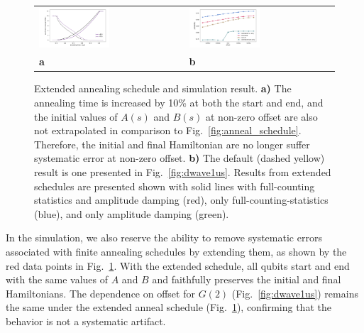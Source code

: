 \documentclass[prd,twocolumn,tightenlines,preprintnumbers,showpacs,superscriptaddress,notitlepage,nofootinbib,eqsecnum,floatfix,longbibliography,aps,10pt]{revtex4-1}
\begin{document}
\begin{figure}
    \centering
	\begin{tabular}{p{}p{}}
	\includegraphics[width=0.5\textwidth]{./anneal_schedule_extended.pdf}
    &
	\includegraphics[width=0.5\textwidth]{./NN2_offset_scaling_extended.pdf}\\
	\centering \textbf{a} & \centering \textbf{b}
	\end{tabular}
	\centering
	\caption{Extended annealing schedule and simulation result. \textbf{a)} The annealing time is increased by 10\% at both the start and end, and the initial values of $A(s)$ and $B(s)$ at non-zero offset are also not extrapolated in comparison to Fig.~\ref{fig:anneal_schedule}. Therefore, the initial and final Hamiltonian are no longer suffer systematic error at non-zero offset. \textbf{b)} The default (dashed yellow) result is one presented in Fig.~\ref{fig:dwave1us}. Results from extended schedules are presented shown with solid lines with full-counting statistics and amplitude damping (red), only full-counting-statistics (blue), and only amplitude damping (green).
    }
	\label{fig:anneal_schedule_ext}
\end{figure}

In the simulation, we also reserve the ability to remove systematic errors associated with finite annealing schedules by extending them, as shown by the red data points in Fig.~\ref{fig:anneal_schedule_ext}. With the extended schedule, all qubits start and end with the same values of $A$ and $B$ and faithfully preserves the initial and final Hamiltonians. The dependence on offset for $G(2)$ (Fig.~\ref{fig:dwave1us}) remains the same under the extended anneal schedule (Fig.~\ref{fig:anneal_schedule_ext}), confirming that the behavior is not a systematic artifact.
\end{document}
